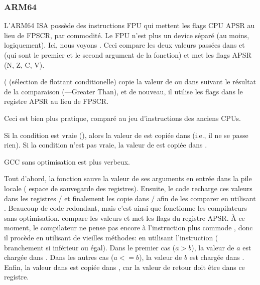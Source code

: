 \subsubsection{ARM64}




L'ARM64 \ac{ISA} possède des instructions FPU qui mettent les flags CPU \ac{APSR}
au lieu de \ac{FPSCR}, par commodité.
Le \ac{FPU} n'est plus un device séparé (au moins, logiquement).
Ici, nous voyons . Ceci compare les deux valeurs passées dans 
et  (qui sont le premier et le second argument de la fonction) et met les
flags \ac{APSR} (N, Z, C, V).

 ( (sélection de flottant conditionelle)
copie la valeur de  ou  dans  suivant le résultat de la comparaison
(---Greater Than), et de nouveau, il utilise les flags dans le registre \ac{APSR}
au lieu de \ac{FPSCR}.

Ceci est bien plus pratique, comparé au jeu d'instructions des anciens CPUs.

Si la condition est vraie (), alors la valeur de  est copiée dans
 (i.e., il ne se passe rien).
Si la condition n'est pas vraie, la valeur de  est copiée dans .




GCC sans optimisation est plus verbeux.

Tout d'abord, la fonction sauve la valeur de ses arguments en entrée dans la pile
locale ( espace de sauvegarde des registres).
Ensuite, le code recharge ces valeurs dans les registres / et finalement
les copie dans / afin de les comparer en utilisant .
Beaucoup de code redondant, mais c'est ainsi que fonctionne les compilateurs sans
optimisation.
 compare les valeurs et met les flags du registre \ac{APSR}.
À ce moment, le compilateur ne pense pas encore à l'instruction plus commode ,
donc il procède en utilisant de vieilles méthodes:
en utilisant l'instruction  ( branchement si
inférieur ou égal).
Dans le premier cas ($a>b$), la valeur de $a$ est chargée dans .
Dans les autres cas ($a<=b$), la valeur de $b$ est chargée dans .
Enfin, la valeur dans  est copiée dans , car la valeur de retour
doit être dans ce registre.

